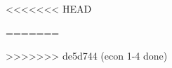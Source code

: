 \documentclass[12pt]{book}
\begin{document}
%    
<<<<<<< HEAD
%         
%         
%         
%         
%         
%         
%         
%         
%         
%         
%         
%         
%         
%         
%         
%         

         


=======
%    


        
        
        
        
        
        
        
        
        
        
        
        



>>>>>>> de5d744 (econ 1-4 done)

%        
\end{document}
